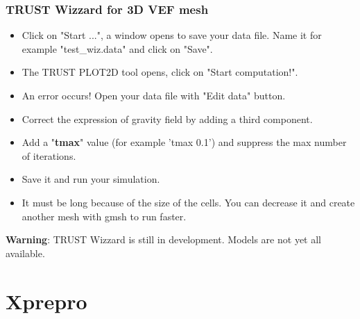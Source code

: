 \documentclass[10pt, hyperref={unicode=true,pdfusetitle, bookmarks=true,bookmarksnumbered=false,bookmarksopen=false, breaklinks=false,pdfborder={0 0 1},backref=true,colorlinks=true,linkcolor=darkblue,pageanchor}]{beamer}
\begin{document}
\begin{frame}
\frametitle{TRUST Wizzard for 3D VEF mesh}
\begin{block}{}

\begin{itemize}
\item Click on "Start ...", a window opens to save your data file. Name it for example "test\_wiz.data" and click on "Save".
\item The TRUST PLOT2D tool opens, click on "Start computation!".
\item An error occurs! Open your data file with "Edit data" button.
\item Correct the expression of gravity field by adding a third component.
\item Add a "\textbf{tmax}" value (for example 'tmax 0.1') and suppress the max number of iterations.
\item Save it and run your simulation.
\item It must be long because of the size of the cells. You can decrease it and create another mesh with gmsh to run faster.
\end{itemize}
\textbf{Warning}: TRUST Wizzard is still in development. Models are not yet all available.
\end{block}
\end{frame}



\section{{\bf{Xprepro}}}
\end{document}
